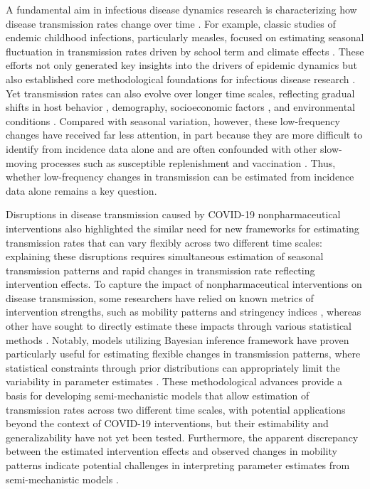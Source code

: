 \documentclass[12pt]{article}
\begin{document}
A fundamental aim in infectious disease dynamics research is characterizing how disease transmission rates change over time \citep{grenfell2002dynamics,hooker2011parameterizing,becker2019long,jagan2020fast}.
For example, classic studies of endemic childhood infections, particularly measles, focused on estimating seasonal fluctuation in transmission rates driven by school term and climate effects \citep{fine1982measles,koelle2005refractory,ferrari2008dynamics,dalziel2016persistent}.
These efforts not only generated key insights into the drivers of epidemic dynamics but also established core methodological foundations for infectious disease research \citep{bjornstad2002dynamics,grenfell2002dynamics,he2010plug,king2016statistical}.
Yet transmission rates can also evolve over longer time scales, reflecting gradual shifts in host behavior \citep{weitz2020awareness,gozzi2025comparative}, demography, socioeconomic factors \citep{becker2019long}, and environmental conditions \citep{baker2019epidemic}.
Compared with seasonal variation, however, these low-frequency changes have received far less attention, in part because they are more difficult to identify from incidence data alone and are often confounded with other slow-moving processes such as susceptible replenishment and vaccination \citep{hooker2011parameterizing}.
Thus, whether low-frequency changes in transmission can be estimated from incidence data alone remains a key question.

Disruptions in disease transmission caused by COVID-19 nonpharmaceutical interventions also highlighted the similar need for new frameworks for estimating transmission rates that can vary flexibly across two different time scales:
explaining these disruptions requires simultaneous estimation of seasonal transmission patterns and rapid changes in transmission rate reflecting intervention effects.
To capture the impact of nonpharmaceutical interventions on disease transmission, some researchers have relied on known metrics of intervention strengths, such as mobility patterns \citep{park2024predicting2,howerton2025using} and stringency indices \citep{holmdahl2024differential,lau2024impact,yan2026impact}, whereas other have sought to directly estimate these impacts through various statistical methods \citep{flaxman2020estimating,bents2023modeling,sauteur2025global,nguyen2026dynamics}.
Notably, models utilizing Bayesian inference framework have proven particularly useful for estimating flexible changes in transmission patterns, where statistical constraints through prior distributions can appropriately limit the variability in parameter estimates \citep{flaxman2020estimating,park2024predicting,nielsen2025complex,park2025interplay}.
These methodological advances provide a basis for developing semi-mechanistic models that allow estimation of transmission rates across two different time scales, with potential applications beyond the context of COVID-19 interventions, but their estimability and generalizability have not yet been tested.
Furthermore, the apparent discrepancy between the estimated intervention effects and observed changes in mobility patterns indicate potential challenges in interpreting parameter estimates from semi-mechanistic models \citep{park2024predicting}.
\end{document}
